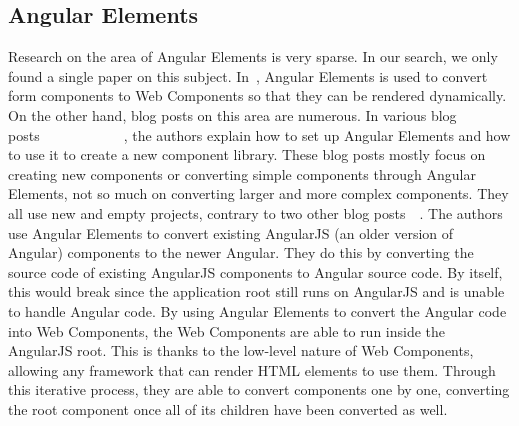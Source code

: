 \subsection{Angular Elements}
Research on the area of Angular Elements is very sparse. In our search, we only found a single paper on this subject. In~\cite{armengol2020development}, Angular Elements is used to convert form components to Web Components so that they can be rendered dynamically. On the other hand, blog posts on this area are numerous. In various blog posts~~~~~~~~~~~~, the authors explain how to set up Angular Elements and how to use it to create a new component library. These blog posts mostly focus on creating new components or converting simple components through Angular Elements, not so much on converting larger and more complex components. They all use new and empty projects, contrary to two other blog posts~~. The authors use Angular Elements to convert existing AngularJS (an older version of Angular) components to the newer Angular. They do this by converting the source code of existing AngularJS components to Angular source code. By itself, this would break since the application root still runs on AngularJS and is unable to handle Angular code. By using Angular Elements to convert the Angular code into Web Components, the Web Components are able to run inside the AngularJS root. This is thanks to the low-level nature of Web Components, allowing any framework that can render HTML elements to use them. Through this iterative process, they are able to convert components one by one, converting the root component once all of its children have been converted as well.

